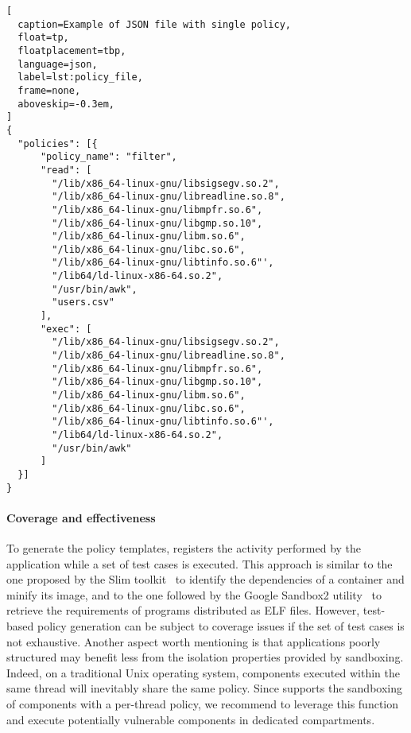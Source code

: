 \begin{lstlisting}[
  caption=Example of JSON file with single policy,
  float=tp,
  floatplacement=tbp,
  language=json,
  label=lst:policy_file,
  frame=none,
  aboveskip=-0.3em,
]
{
  "policies": [{
      "policy_name": "filter",
      "read": [
        "/lib/x86_64-linux-gnu/libsigsegv.so.2",
        "/lib/x86_64-linux-gnu/libreadline.so.8",
        "/lib/x86_64-linux-gnu/libmpfr.so.6",
        "/lib/x86_64-linux-gnu/libgmp.so.10",
        "/lib/x86_64-linux-gnu/libm.so.6",
        "/lib/x86_64-linux-gnu/libc.so.6",
        "/lib/x86_64-linux-gnu/libtinfo.so.6"',
        "/lib64/ld-linux-x86-64.so.2",
        "/usr/bin/awk",
        "users.csv"
      ],
      "exec": [
        "/lib/x86_64-linux-gnu/libsigsegv.so.2",
        "/lib/x86_64-linux-gnu/libreadline.so.8",
        "/lib/x86_64-linux-gnu/libmpfr.so.6",
        "/lib/x86_64-linux-gnu/libgmp.so.10",
        "/lib/x86_64-linux-gnu/libm.so.6",
        "/lib/x86_64-linux-gnu/libc.so.6",
        "/lib/x86_64-linux-gnu/libtinfo.so.6"',
        "/lib64/ld-linux-x86-64.so.2",
        "/usr/bin/awk"
      ]
  }]
}
\end{lstlisting}

\paragraph*{Coverage and effectiveness}

To generate the policy templates, \dmng registers the activity
performed by the application while a set of test cases is
executed. This approach is similar to the one proposed by the Slim
toolkit~\cite{slimtoolkit} to identify the dependencies of a container
and minify its image, and to the one followed by the Google Sandbox2
utility~\cite{sandbox2} to retrieve the requirements of programs
distributed as ELF files. However, test-based policy generation can be
subject to coverage issues if the set of test cases is not
exhaustive. Another aspect worth mentioning is that applications
poorly structured may benefit less from the isolation properties
provided by sandboxing. Indeed, on a traditional Unix operating
system, components executed within the same thread will inevitably
share the same policy. Since \dmng supports the sandboxing of
components with a per-thread policy, we recommend to leverage this
function and execute potentially vulnerable components in dedicated
compartments.

